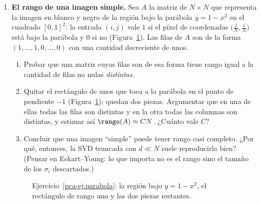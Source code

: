 \begin{enumerate}[leftmargin=*,label=\textbf{\thechapter.\arabic*},ref=\thechapter.\arabic*,itemsep=4pt]
\item {} \textbf{El rango de una imagen simple.}\label{pca-ej:parabola}
Sea $A$ la matriz de $N\times N$ que representa la imagen en blanco y negro
de la región bajo la parábola $y=1-x^2$ en el cuadrado $[0,1]^2$: la entrada
$(i,j)$ vale $1$ si el píxel de coordenadas $\bigl(\tfrac jN,\tfrac iN\bigr)$
está bajo la parábola y $0$ si no (Figura~\ref{pca-fig:parabola}). Las filas de
$A$ son de la forma $(1,\dots,1,0,\dots,0)$ con una cantidad decreciente de
unos.
\begin{enumerate}[label=(\alph*)]
\item Probar que una matriz cuyas filas son de esa forma tiene rango igual a la
cantidad de filas no nulas \emph{distintas}.
\item Quitar el rectángulo de unos que toca a la parábola en el punto de
pendiente $-1$ (Figura~\ref{pca-fig:parabola}); quedan dos piezas. Argumentar que
en una de ellas todas las filas son distintas y en la otra todas las columnas
son distintas, y estimar así $\rango(A)\approx CN$. ¿Cuánto vale $C$?
\item Concluir que una imagen ``simple'' puede tener rango casi completo.
¿Por qué, entonces, la SVD truncada con $d\ll N$ suele reproducirla bien?
(Pensar en Eckart--Young: lo que importa no es el rango sino el tamaño de los
$\sigma_i$ descartados.)
\end{enumerate}
\begin{figure}[!htb]
\centering
{}
\caption{Ejercicio~\ref{pca-ej:parabola}: la región bajo $y=1-x^2$, el
rectángulo de rango uno y las dos piezas restantes.}
\label{pca-fig:parabola}
\end{figure}


\end{enumerate}

